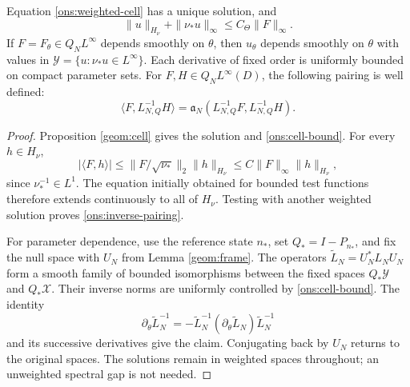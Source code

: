 \begin{lemma}\label{ons:cell}
 Equation \eqref{ons:weighted-cell} has a unique solution, and
 \begin{equation}\label{ons:cell-bound}
 \|u\|_{H_\nu}+\|\nu_*u\|_\infty\le C_\Theta\|F\|_\infty.
 \end{equation}
 If $F=F_\theta\in Q_NL^\infty$ depends smoothly on $\theta$, then
 $u_\theta$ depends smoothly on $\theta$ with values in
 $\mathcal Y=\{u:\nu_*u\in L^\infty\}$. Each derivative of fixed order
 is uniformly bounded on compact parameter sets.
 For $F,H\in Q_NL^\infty(D)$, the following pairing is well defined:
 \begin{equation}\label{ons:inverse-pairing}
 \langle F,L_{N,Q}^{-1}H\rangle
 =\mathfrak a_N(L_{N,Q}^{-1}F,L_{N,Q}^{-1}H).
 \end{equation}
\end{lemma}
\begin{proof}
 Proposition \ref{geom:cell} gives the solution and
 \eqref{ons:cell-bound}. For every $h\in H_\nu$,
 \[
 |\langle F,h\rangle|
 \le\|F/\sqrt{\nu_*}\|_2\|h\|_{H_\nu}
 \le C\|F\|_\infty\|h\|_{H_\nu},
 \]
 since $\nu_*^{-1}\in L^1$. The equation initially obtained for bounded
 test functions therefore extends continuously to all of $H_\nu$.
 Testing with another weighted solution proves
 \eqref{ons:inverse-pairing}.

 For parameter dependence, use the reference state $n_*$, set
 $Q_*=I-P_{n_*}$, and fix the null space with $U_N$ from
 Lemma \ref{geom:frame}. The operators
 $\widetilde L_N=U_N^*L_NU_N$ form a smooth family of bounded
 isomorphisms between the fixed spaces
 $Q_*\mathcal Y$ and $Q_*\mathcal X$. Their inverse norms are uniformly
 controlled by \eqref{ons:cell-bound}. The identity
 \[
 \partial_\theta\widetilde L_N^{-1}
 =-\widetilde L_N^{-1}(\partial_\theta\widetilde L_N)
       \widetilde L_N^{-1}
 \]
 and its successive derivatives give the claim. Conjugating back by
 $U_N$ returns to the original spaces. The solutions remain in weighted
 spaces throughout; an unweighted spectral gap is not needed.
\end{proof}

